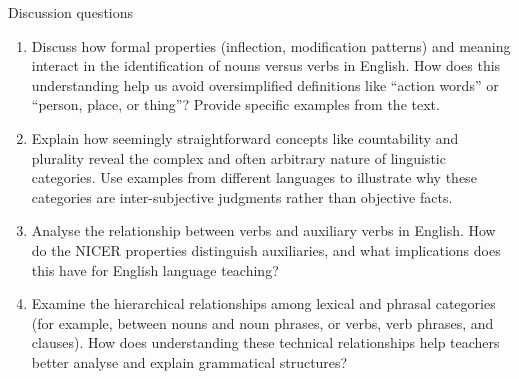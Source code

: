 \begin{tblslineshorizontal}{Discussion questions}

\begin{enumerate}[noitemsep]
    \item Discuss how formal properties (inflection, modification patterns) and meaning interact in the identification of nouns versus verbs in English. How does this understanding help us avoid oversimplified definitions like \enquote{action words} or \enquote{person, place, or thing}? Provide specific examples from the text.

    \item Explain how seemingly straightforward concepts like countability and plurality reveal the complex and often arbitrary nature of linguistic categories. Use examples from different languages to illustrate why these categories are inter-subjective judgments rather than objective facts.

    \item Analyse the relationship between verbs and auxiliary verbs in English. How do the NICER properties distinguish auxiliaries, and what implications does this have for English language teaching?

    \item Examine the hierarchical relationships among lexical and phrasal categories (for example, between nouns and noun phrases, or verbs, verb phrases, and clauses). How does understanding these technical relationships help teachers better analyse and explain grammatical structures?
\end{enumerate}

\end{tblslineshorizontal}
